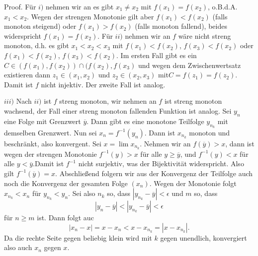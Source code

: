 \begin{emphBox}{}{}
Proof.  Für \(i)\) nehmen wir an es gibt \(x_1 \neq x_2\) mit \(f(x_1) = f(x_2)\), o.B.d.A. \(x_1 < x_2\). Wegen der strengen Monotonie gilt aber \(f(x_1) < f(x_2)\) (falls monoton steigend) oder \(f(x_1) > f(x_2)\) (falls monoton fallend), beides widerspricht \(f(x_1) = f(x_2)\).
Für \(ii)\) nehmen wir an \(f\) wäre nicht streng monoton, d.h. es gibt \(x_1 < x_2 < x_3\) mit \(f(x_1) < f(x_2)\), \(f(x_3) < f(x_2)\) oder \(f(x_1) < f(x_2)\), \(f(x_3) < f(x_2)\). Im ersten Fall gibt es ein \(C \in (f(x_1),f(x_2)) \cap (f(x_2),f(x_3)\) und wegen dem Zwischenwertsatz existieren dann \(z_1 \in (x_1,x_2)\) und \(z_2 \in (x_2,x_3)\) mit\(C = f(z_1) = f(z_2)\). Damit ist \(f\) nicht injektiv. Der zweite Fall ist analog.

\(iii)\) Nach \(ii)\) ist \(f\) streng monoton, wir nehmen an \(f\) ist streng monoton wachsend, der Fall einer streng monoton fallenden Funktion ist analog. Sei \(y_n\) eine Folge mit Grenzwert \(\overline{y}\). Dann gibt es eine monotone Teilfolge \(y_{n_k}\) mit demselben Grenzwert. Nun sei \(x_n = f^{-1}(y_n)\). Dann ist \(x_{n_k}\) monoton und beschränkt, also konvergent. Sei \(x= \lim x_{n_k}\). Nehmen wir an \(f(\overline{y}) > x\), dann ist wegen der strengen Monotonie \(f^{-1}(y) > x\) für alle \(y \geq \overline{y}\), und \(f^{-1}(y) < x\) für alle \(y < \overline{y}\).Damit ist \(f^{-1}\) nicht surjektiv, was der Bijektivität widerspricht. Also gilt \(f^{-1}(\overline{y}) = x\). Abschließend folgern wir aus der Konvergenz der Teilfolge auch noch die Konvergenz der gesamten Folge \((x_n)\). Wegen der Monotonie folgt \(x_{n_k} < x_n\) für \(y_{n_k} < y_n\). Sei also \(n_k\) so, dass  \(|y_{n_k} - \overline{y}| < \epsilon\) und \(m\) so, dass
\begin{equation*}
 |y_{n} - \overline{y}| < |y_{n_k} - \overline{y}| < \epsilon
\end{equation*}
für \(n \geq m\) ist. Dann folgt auc
\begin{equation*}
 |x_n - x|  = x - x_n < x-x_{n_k} = |x-x_{n_k}|.
\end{equation*}
Da die rechte Seite gegen beliebig klein wird mit \(k\) gegen unendlich, konvergiert also auch \(x_n\) gegen \(x\).
\end{emphBox}


